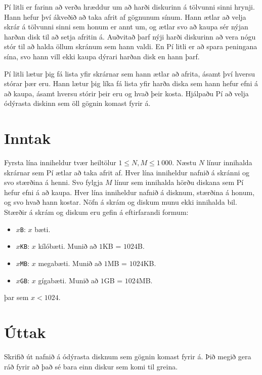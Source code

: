 

Pí litli er farinn að verða hræddur um að harði diskurinn á tölvunni sinni
hrynji. Hann hefur því ákveðið að taka afrit af gögnunum sínum. Hann ætlar að
velja skrár á tölvunni sinni sem honum er annt um, og ætlar svo að kaupa sér
nýjan harðan disk til að setja afritin á. Auðvitað þarf nýji harði diskurinn að
vera nógu stór til að halda öllum skránum sem hann valdi. En Pí litli er að
spara peningana sína, svo hann vill ekki kaupa dýrari harðan disk en hann þarf.

Pí litli lætur þig fá lista yfir skrárnar sem hann ætlar að afrita, ásamt því
hversu stórar þær eru. Hann lætur þig líka fá lista yfir harða diska sem hann
hefur efni á að kaupa, ásamt hversu stórir þeir eru og hvað þeir kosta.
Hjálpaðu Pí að velja ódýrasta diskinn sem öll gögnin komast fyrir á.

\section*{Inntak}
Fyrsta lína inniheldur tvær heiltölur $1 \leq N, M \leq 1\,000$. Næstu $N$
línur innihalda skrárnar sem Pí ætlar að taka afrit af. Hver lína inniheldur
nafnið á skránni og svo stærðina á henni. Svo fylgja $M$ línur sem innihalda
hörðu diskana sem Pí hefur efni á að kaupa. Hver lína inniheldur nafnið á
disknum, stærðina á honum, og svo hvað hann kostar. Nöfn á skrám og diskum munu
ekki innihalda bil. Stærðir á skrám og diskum eru gefin á eftirfarandi formum:
\begin{itemize}
\item \texttt{$x$B}: $x$ bæti.
\item \texttt{$x$KB}: $x$ kílóbæti. Munið að $1$KB = $1024$B.
\item \texttt{$x$MB}: $x$ megabæti. Munið að $1$MB = $1024$KB.
\item \texttt{$x$GB}: $x$ gígabæti. Munið að $1$GB = $1024$MB.
\end{itemize}
þar sem $x < 1024$.

\section*{Úttak}
Skrifið út nafnið á ódýrasta disknum sem gögnin komast fyrir á. Þið megið gera
ráð fyrir að það sé bara einn diskur sem komi til greina.

